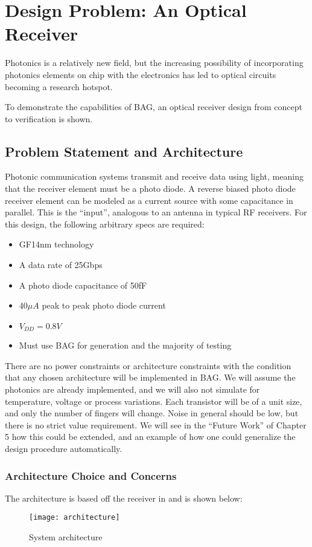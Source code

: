 \chapter{Design Problem: An Optical Receiver}

Photonics is a relatively new field, but the increasing possibility of incorporating photonics elements on chip with the electronics has led to optical circuits becoming a research hotspot. 

To demonstrate the capabilities of BAG, an optical receiver design from concept to verification is shown.

\section{Problem Statement and Architecture}
Photonic communication systems transmit and receive data using light, meaning that the receiver element must be a photo diode. A reverse biased photo diode receiver element can be modeled as a current source with some capacitance in parallel. This is the ``input'', analogous to an antenna in typical RF receivers. For this design, the following arbitrary specs are required:
\begin{itemize}
\item GF14nm technology
\item A data rate of 25Gbps
\item A photo diode capacitance of 50fF
\item $40\mu A$ peak to peak photo diode current
\item $V_{DD}=0.8V$
\item Must use BAG for generation and the majority of testing
\end{itemize}

There are no power constraints or architecture constraints with the condition that any chosen architecture will be implemented in BAG. We will assume the photonics are already implemented, and we will also not simulate for temperature, voltage or process variations. Each transistor will be of a unit size, and only the number of fingers will change. Noise in general should be low, but there is no strict value requirement. We will see in the ``Future Work'' of Chapter 5 how this could be extended, and an example of how one could generalize the design procedure automatically.

\subsection{Architecture Choice and Concerns}
The architecture is based off the receiver in \cite{settaluri_photonic_nodate} and is shown below:
\begin{figure}[h]
\centering
\texttt{[image: architecture]}
\caption{System architecture}
\label{fig:System Architecture}
\end{figure}

